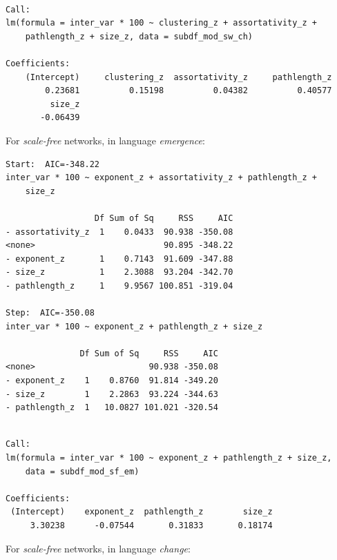 \documentclass[
]{article}
\begin{document}
\begin{verbatim}

Call:
lm(formula = inter_var * 100 ~ clustering_z + assortativity_z + 
    pathlength_z + size_z, data = subdf_mod_sw_ch)

Coefficients:
    (Intercept)     clustering_z  assortativity_z     pathlength_z  
        0.23681          0.15198          0.04382          0.40577  
         size_z  
       -0.06439  
\end{verbatim}

For \emph{scale-free} networks, in language \emph{emergence}:

\begin{verbatim}
Start:  AIC=-348.22
inter_var * 100 ~ exponent_z + assortativity_z + pathlength_z + 
    size_z

                  Df Sum of Sq     RSS     AIC
- assortativity_z  1    0.0433  90.938 -350.08
<none>                          90.895 -348.22
- exponent_z       1    0.7143  91.609 -347.88
- size_z           1    2.3088  93.204 -342.70
- pathlength_z     1    9.9567 100.851 -319.04

Step:  AIC=-350.08
inter_var * 100 ~ exponent_z + pathlength_z + size_z

               Df Sum of Sq     RSS     AIC
<none>                       90.938 -350.08
- exponent_z    1    0.8760  91.814 -349.20
- size_z        1    2.2863  93.224 -344.63
- pathlength_z  1   10.0827 101.021 -320.54
\end{verbatim}

\begin{verbatim}

Call:
lm(formula = inter_var * 100 ~ exponent_z + pathlength_z + size_z, 
    data = subdf_mod_sf_em)

Coefficients:
 (Intercept)    exponent_z  pathlength_z        size_z  
     3.30238      -0.07544       0.31833       0.18174  
\end{verbatim}

For \emph{scale-free} networks, in language \emph{change}:
\end{document}
